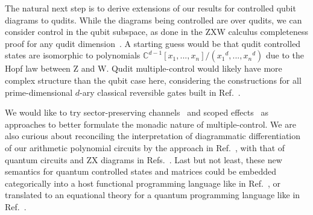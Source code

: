 The natural next step is to derive extensions of our results for controlled qubit diagrams to qudits.
While the diagrams being controlled are over qudits, we can consider control in the qubit subspace, as done in the ZXW calculus completeness proof for any qudit dimension~\cite{poor2023completeness}.
A starting guess would be that qudit controlled states are isomorphic to polynomials $\mathbb{C}^{d-1}[x_1,...,x_n]/({x_1}^d,...,{x_n}^d)$ due to the Hopf law between Z and W.
Qudit multiple-control would likely have more complex structure than the qubit case here, considering the constructions for all prime-dimensional $d$-ary classical reversible gates built in Ref.~\cite{Roy2023quditzh}.

We would like to try sector-preserving channels~\cite{Vanrietvelde2021ctrlsector} and scoped effects~\cite{lindley2024scoped} as approaches to better formulate the monadic nature of multiple-control.
We are also curious about reconciling the interpretation of diagrammatic differentiation of our arithmetic polynomial circuits by the approach in Ref.~\cite{wilson2023diffpolycirc}, with that of quantum circuits and ZX diagrams in Refs.~\cite{toumi2021diagdiff, wang2022diffintzx, jeandel2024adddiffzx}.
Last but not least, these new semantics for quantum controlled states and matrices could be embedded categorically into a host functional programming language like in Ref.~\cite{rennela2020clctrllinlogic}, or translated to an equational theory for a quantum programming language like in Ref.~\cite{staton2015algqpl}.